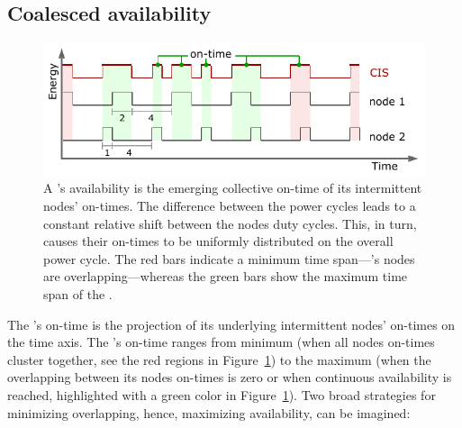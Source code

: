 \subsection{Coalesced availability}
\label{subSec:availability}
%
\begin{figure}[t]
		\centering
		\includegraphics[width=\columnwidth]{figures/cisOntime}
		\caption{A \fullsys's availability is the emerging collective on-time of its intermittent nodes' on-times. The difference between the power cycles leads to a constant relative shift between the nodes duty cycles. This, in turn, causes their on-times to be uniformly distributed on the overall power cycle. The red bars indicate a minimum \sys time span---\sys's nodes are overlapping---whereas the green bars show the maximum time span of the \sys.}
		\label{fig:cisOntime}
\end{figure} 
%
The \sys's on-time is the projection of its underlying intermittent nodes' on-times on the time axis. The \sys's on-time ranges from minimum (when all nodes on-times cluster together, see the red regions in Figure~\ref{fig:cisOntime}) to the maximum (when the overlapping between its nodes on-times is zero or when continuous availability is reached, highlighted with a green color in Figure~\ref{fig:cisOntime}). Two broad strategies for minimizing overlapping, hence, maximizing \sys availability, can be imagined: 

